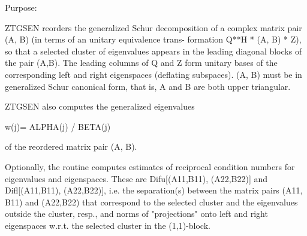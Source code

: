  \begin{DoxyParagraph}{Purpose\+: }
\begin{DoxyVerb} ZTGSEN reorders the generalized Schur decomposition of a complex
 matrix pair (A, B) (in terms of an unitary equivalence trans-
 formation Q**H * (A, B) * Z), so that a selected cluster of eigenvalues
 appears in the leading diagonal blocks of the pair (A,B). The leading
 columns of Q and Z form unitary bases of the corresponding left and
 right eigenspaces (deflating subspaces). (A, B) must be in
 generalized Schur canonical form, that is, A and B are both upper
 triangular.

 ZTGSEN also computes the generalized eigenvalues

          w(j)= ALPHA(j) / BETA(j)

 of the reordered matrix pair (A, B).

 Optionally, the routine computes estimates of reciprocal condition
 numbers for eigenvalues and eigenspaces. These are Difu[(A11,B11),
 (A22,B22)] and Difl[(A11,B11), (A22,B22)], i.e. the separation(s)
 between the matrix pairs (A11, B11) and (A22,B22) that correspond to
 the selected cluster and the eigenvalues outside the cluster, resp.,
 and norms of "projections" onto left and right eigenspaces w.r.t.
 the selected cluster in the (1,1)-block.\end{DoxyVerb}
 
\end{DoxyParagraph}

